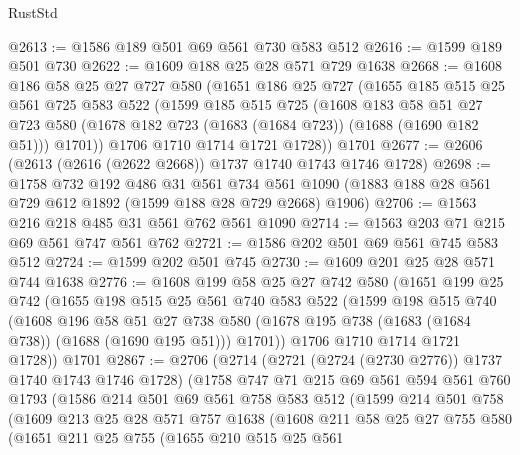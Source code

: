 \begin{lexlean}{RustStd}
\begin{coremodule}
@2613 := @1586 @189 @501 @69 @561 @730 @583 @512
@2616 := @1599 @189 @501 @730
@2622 := @1609 @188 @25 @28 @571 @729 @1638
@2668 := @1608
    @186
    @58
    @25
    @27
    @727
    @580
    (@1651
      @186
      @25
      @727
      (@1655
        @185
        @515
        @25
        @561
        @725
        @583
        @522
        (@1599
          @185
          @515
          @725
          (@1608
            @183
            @58
            @51
            @27
            @723
            @580
            (@1678 @182 @723 (@1683 (@1684 @723)) (@1688 (@1690 @182 @51)))
            @1701))
        @1706
        @1710
        @1714
        @1721
        @1728))
    @1701
@2677 := @2606 (@2613 (@2616 (@2622 @2668)) @1737 @1740 @1743 @1746 @1728)
@2698 := @1758
    @732
    @192
    @486
    @31
    @561
    @734
    @561
    @1090
    (@1883 @188 @28 @561 @729 @612 @1892 (@1599 @188 @28 @729 @2668) @1906)
@2706 := @1563 @216 @218 @485 @31 @561 @762 @561 @1090
@2714 := @1563 @203 @71 @215 @69 @561 @747 @561 @762
@2721 := @1586 @202 @501 @69 @561 @745 @583 @512
@2724 := @1599 @202 @501 @745
@2730 := @1609 @201 @25 @28 @571 @744 @1638
@2776 := @1608
    @199
    @58
    @25
    @27
    @742
    @580
    (@1651
      @199
      @25
      @742
      (@1655
        @198
        @515
        @25
        @561
        @740
        @583
        @522
        (@1599
          @198
          @515
          @740
          (@1608
            @196
            @58
            @51
            @27
            @738
            @580
            (@1678 @195 @738 (@1683 (@1684 @738)) (@1688 (@1690 @195 @51)))
            @1701))
        @1706
        @1710
        @1714
        @1721
        @1728))
    @1701
@2867 := @2706
    (@2714
      (@2721 (@2724 (@2730 @2776)) @1737 @1740 @1743 @1746 @1728)
      (@1758
        @747
        @71
        @215
        @69
        @561
        @594
        @561
        @760
        @1793
        (@1586
          @214
          @501
          @69
          @561
          @758
          @583
          @512
          (@1599
            @214
            @501
            @758
            (@1609
              @213
              @25
              @28
              @571
              @757
              @1638
              (@1608
                @211
                @58
                @25
                @27
                @755
                @580
                (@1651
                  @211
                  @25
                  @755
                  (@1655
                    @210
                    @515
                    @25
                    @561

\end{coremodule}
\end{lexlean}

